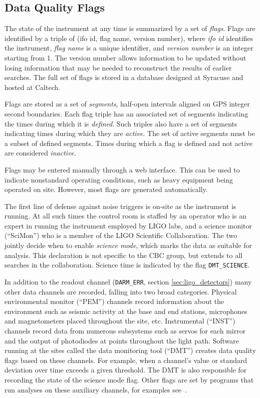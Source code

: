 
\subsection{Data Quality Flags}

The state of the instrument at any time is summarized by a set of
\emph{flags}.  Flags are identified by a triple of (ifo id, flag name,
version number), where \emph{ifo id} identifies the instrument,
\emph{flag name} is a unique identifier, and \emph{version number} is
an integer starting from 1.  The version number allows information to
be updated without losing information that may be needed to
reconstruct the results of earlier searches.  The full set of flags is
stored in a database designed at Syracuse and hosted at Caltech.

Flags are stored as a set of \emph{segments}, half-open intervals
aligned on GPS integer second boundaries.  Each flag triple has an
associated set of segments indicating the times during which it is
\emph{defined}.  Such triples also have a set of segments indicating
times during which they are \emph{active}.  The set of active segments
must be a subset of defined segments.  Times during which a flag is
defined and not active are considered \emph{inactive}.

Flags may be entered manually through a web interface.  This can be
used to indicate nonstandard operating conditions, such as heavy
equipment being operated on site.  However, most flags are generated
automatically.

The first line of defense against noise triggers is on-site as the
instrument is running.  At all such times the control room is staffed
by an operator who is an expert in running the instrument employed by
LIGO labs, and a science monitor (``SciMon'') who is a member of the
LIGO Scientific Collaboration.  The two jointly decide when to enable
\emph{science mode}, which marks the data as suitable for analysis.
This declaration is not specific to the CBC group, but extends to all
searches in the collaboration.  Science time is indicated by the flag
\texttt{DMT\_SCIENCE}.

In addition to the readout channel (\texttt{DARM\_ERR}, section
\ref{sec:ligo_detectors}) many other data channels are recorded,
falling into two broad categories.  Physical environmental monitor
(``PEM'') channels record information about the environment such as
seismic activity at the base and end stations, microphones and
magnetometers placed throughout the site, etc.  Instrumental
(``INST'') channels record data from numerous subsystems such as
servos for each mirror and the output of photodiodes at points
throughout the light path.  Software running at the sites called the
data monitoring tool (``DMT'') creates data quality flags based on
these channels.  For example, when a channel's value or standard
deviation over time exceeds a given threshold.  The DMT is also
responsible for recording the state of the science mode flag.  Other
flags are set by programs that run analyses on these auxiliary
channels, for examples see~\cite{Isogai:2010}.


